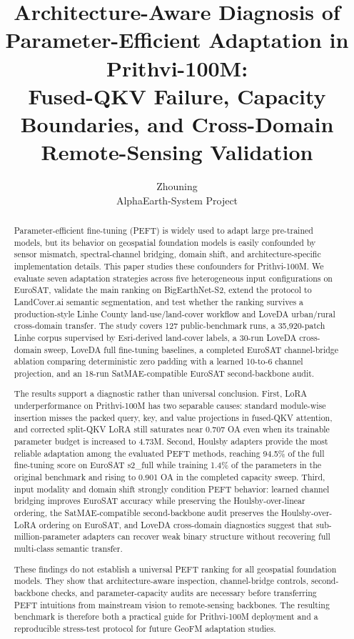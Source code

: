 \documentclass[11pt]{article}
\title{Architecture-Aware Diagnosis of Parameter-Efficient Adaptation in Prithvi-100M:\\
Fused-QKV Failure, Capacity Boundaries, and Cross-Domain Remote-Sensing Validation}
\author{Zhouning \\ AlphaEarth-System Project}
\date{}
\begin{document}
\maketitle

\begin{abstract}
Parameter-efficient fine-tuning (PEFT) is widely used to adapt large pre-trained models, but its behavior on geospatial foundation models is easily confounded by sensor mismatch, spectral-channel bridging, domain shift, and architecture-specific implementation details. This paper studies these confounders for Prithvi-100M. We evaluate seven adaptation strategies across five heterogeneous input configurations on EuroSAT, validate the main ranking on BigEarthNet-S2, extend the protocol to LandCover.ai semantic segmentation, and test whether the ranking survives a production-style Linhe County land-use/land-cover workflow and LoveDA urban/rural cross-domain transfer. The study covers 127 public-benchmark runs, a 35{,}920-patch Linhe corpus supervised by Esri-derived land-cover labels, a 30-run LoveDA cross-domain sweep, LoveDA full fine-tuning baselines, a completed EuroSAT channel-bridge ablation comparing deterministic zero padding with a learned 10-to-6 channel projection, and an 18-run SatMAE-compatible EuroSAT second-backbone audit.

The results support a diagnostic rather than universal conclusion. First, LoRA underperformance on Prithvi-100M has two separable causes: standard module-wise insertion misses the packed query, key, and value projections in fused-QKV attention, and corrected split-QKV LoRA still saturates near 0.707 OA even when its trainable parameter budget is increased to 4.73M. Second, Houlsby adapters provide the most reliable adaptation among the evaluated PEFT methods, reaching 94.5\% of the full fine-tuning score on EuroSAT s2\_full while training 1.4\% of the parameters in the original benchmark and rising to 0.901 OA in the completed capacity sweep. Third, input modality and domain shift strongly condition PEFT behavior: learned channel bridging improves EuroSAT accuracy while preserving the Houlsby-over-linear ordering, the SatMAE-compatible second-backbone audit preserves the Houlsby-over-LoRA ordering on EuroSAT, and LoveDA cross-domain diagnostics suggest that sub-million-parameter adapters can recover weak binary structure without recovering full multi-class semantic transfer.

These findings do not establish a universal PEFT ranking for all geospatial foundation models. They show that architecture-aware inspection, channel-bridge controls, second-backbone checks, and parameter-capacity audits are necessary before transferring PEFT intuitions from mainstream vision to remote-sensing backbones. The resulting benchmark is therefore both a practical guide for Prithvi-100M deployment and a reproducible stress-test protocol for future GeoFM adaptation studies.
\end{abstract}
\end{document}
